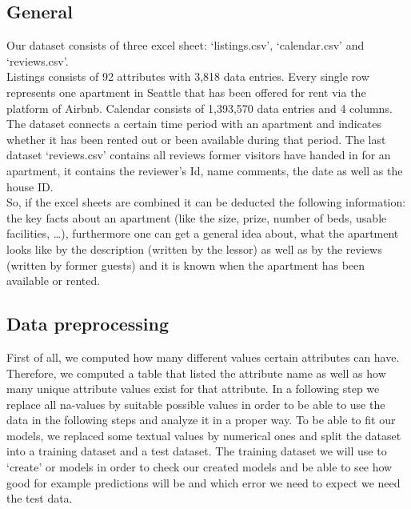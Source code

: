 \documentclass[journal]{IEEEtran}
\begin{document}
\subsection {General}
\noindent Our dataset consists of three excel sheet: ‘listings.csv’, ‘calendar.csv’ and ‘reviews.csv’.\\
Listings consists of 92 attributes with 3,818 data entries. Every single row represents one apartment in Seattle that has been offered for rent via the platform of Airbnb. Calendar consists of 1,393,570 data entries and 4 columns. The dataset connects a certain time period with an apartment and indicates whether it has been rented out or been available during that period. The last dataset ‘reviews.csv’ contains all reviews former visitors have handed in for an apartment, it contains the reviewer’s Id, name comments, the date as well as the house ID.\\So, if the excel sheets are combined it can be deducted the following information: the key facts about an apartment (like the size, prize, number of beds, usable facilities, …), furthermore one can get a general idea about, what the apartment looks like by the description (written by the lessor) as well as by the reviews (written by former guests) and it is known when the apartment has been available or rented.

\subsection {Data preprocessing}
\noindent First of all, we computed how many different values certain attributes can have. Therefore, we computed a table that listed the attribute name as well as how many unique attribute values exist for that attribute.
In a following step we replace all na-values by suitable possible values in order to be able to use the data in the following steps and analyze it in a proper way. To be able to fit our models, we replaced some textual values by numerical ones and split the dataset into a training dataset and a test dataset. The training dataset we will use to ‘create’ or models in order to check our created models and be able to see how good for example predictions will be and which error we need to expect we need the test data.
\end{document}
